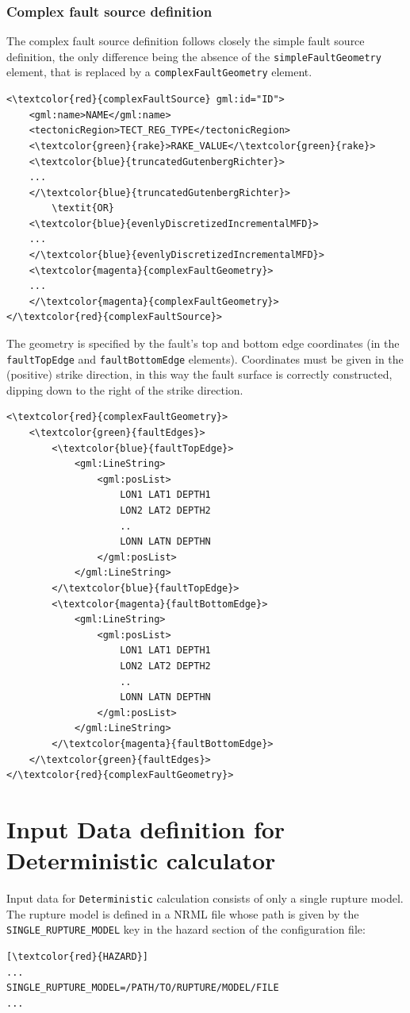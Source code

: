 \subsubsection{Complex fault source definition}
The complex fault source definition follows closely the simple fault source definition, the only difference being the absence of the \Verb+simpleFaultGeometry+ element, that is replaced by a \Verb+complexFaultGeometry+ element.
\begin{Verbatim}[frame=single, commandchars=\\\{\},fontsize=\normalsize, samepage=true]
<\textcolor{red}{complexFaultSource} gml:id="ID">
	<gml:name>NAME</gml:name>
	<tectonicRegion>TECT_REG_TYPE</tectonicRegion>
	<\textcolor{green}{rake}>RAKE_VALUE</\textcolor{green}{rake}>
	<\textcolor{blue}{truncatedGutenbergRichter}>
	...
	</\textcolor{blue}{truncatedGutenbergRichter}>
		\textit{OR}
	<\textcolor{blue}{evenlyDiscretizedIncrementalMFD}>
	...
	</\textcolor{blue}{evenlyDiscretizedIncrementalMFD}>
	<\textcolor{magenta}{complexFaultGeometry}>
	...
	</\textcolor{magenta}{complexFaultGeometry}>
</\textcolor{red}{complexFaultSource}>
\end{Verbatim}
The geometry is specified by the fault's top and bottom edge coordinates (in the \Verb+faultTopEdge+ and \Verb+faultBottomEdge+ elements). Coordinates must be given in the (positive) strike direction, in this way the fault surface is correctly constructed, dipping down to the right of the strike direction.
\begin{Verbatim}[frame=single, commandchars=\\\{\},fontsize=\normalsize, samepage=true]
<\textcolor{red}{complexFaultGeometry}>
	<\textcolor{green}{faultEdges}>
		<\textcolor{blue}{faultTopEdge}>
			<gml:LineString>
				<gml:posList>
					LON1 LAT1 DEPTH1
					LON2 LAT2 DEPTH2
					..
					LONN LATN DEPTHN
				</gml:posList>
			</gml:LineString>
		</\textcolor{blue}{faultTopEdge}>
		<\textcolor{magenta}{faultBottomEdge}>
			<gml:LineString>
				<gml:posList>
					LON1 LAT1 DEPTH1
					LON2 LAT2 DEPTH2
					..
					LONN LATN DEPTHN
				</gml:posList>
			</gml:LineString>
		</\textcolor{magenta}{faultBottomEdge}>
	</\textcolor{green}{faultEdges}>
</\textcolor{red}{complexFaultGeometry}>
\end{Verbatim}


\newpage
\section{Input Data definition for Deterministic calculator}
Input data for \Verb+Deterministic+ calculation consists of only a single rupture model. The rupture model is defined in a NRML file whose path is given by the \Verb+SINGLE_RUPTURE_MODEL+ key in the hazard section of the configuration file:
\begin{Verbatim}[frame=single, commandchars=\\\{\}, samepage=true]
[\textcolor{red}{HAZARD}]
...
SINGLE_RUPTURE_MODEL=/PATH/TO/RUPTURE/MODEL/FILE
...
\end{Verbatim}
